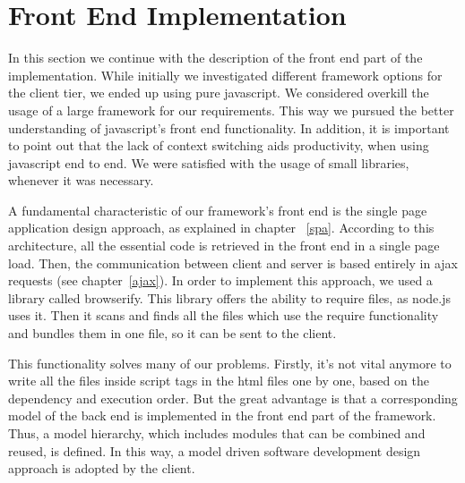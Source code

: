 \section{Front End Implementation}
In this section we continue with the description of the front end part of the implementation. While initially we investigated different framework options for the client tier, we ended up using pure javascript. We considered overkill the usage of a large framework for our requirements. This way we pursued the better understanding of javascript's front end functionality. In addition, it is important to point out that the lack of context switching aids productivity, when using javascript end to end. We were satisfied with the usage of small libraries, whenever it was necessary. \par 
	A fundamental characteristic of our framework's front end is the single page application design approach, as explained in chapter ~\ref{spa}. According to this architecture, all the essential code is retrieved in the front end in a single page load. Then, the communication between client and server is based entirely in ajax requests (see chapter~\ref{ajax}). In order to implement this approach, we used a library called browserify. This library offers the ability to require files, as node.js uses it. Then it scans and finds all the files which use the require functionality and bundles them in one file, so it can be sent to the client. \par
	This functionality solves many of our problems. Firstly, it's not vital anymore to write all the files inside script tags in the html files one by one, based on the dependency and execution order. But the great advantage is that a corresponding model of the back end is implemented in the front end part of the framework. Thus, a model hierarchy, which includes modules that can be combined and reused, is defined. In this way, a model driven software development design approach is adopted by the client.


